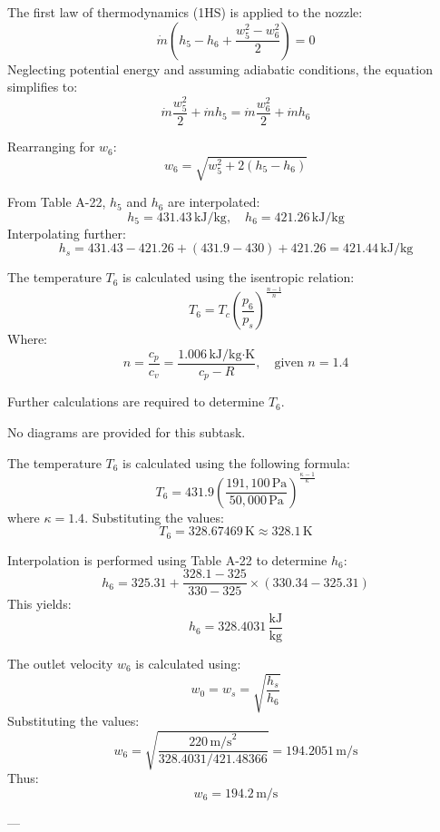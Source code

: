 The first law of thermodynamics (1HS) is applied to the nozzle:  
\[
\dot{m} \left( h_5 - h_6 + \frac{w_5^2 - w_6^2}{2} \right) = 0
\]  
Neglecting potential energy and assuming adiabatic conditions, the equation simplifies to:  
\[
\dot{m} \frac{w_5^2}{2} + \dot{m} h_5 = \dot{m} \frac{w_6^2}{2} + \dot{m} h_6
\]  

Rearranging for \( w_6 \):  
\[
w_6 = \sqrt{w_5^2 + 2(h_5 - h_6)}
\]  

From Table A-22, \( h_5 \) and \( h_6 \) are interpolated:  
\[
h_5 = 431.43 \, \text{kJ/kg}, \quad h_6 = 421.26 \, \text{kJ/kg}
\]  
Interpolating further:  
\[
h_s = 431.43 - 421.26 + (431.9 - 430) + 421.26 = 421.44 \, \text{kJ/kg}
\]  

The temperature \( T_6 \) is calculated using the isentropic relation:  
\[
T_6 = T_c \left( \frac{p_6}{p_s} \right)^{\frac{n-1}{n}}
\]  
Where:  
\[
n = \frac{c_p}{c_v} = \frac{1.006 \, \text{kJ/kg·K}}{c_p - R}, \quad \text{given } n = 1.4
\]  

Further calculations are required to determine \( T_6 \).  

No diagrams are provided for this subtask.

The temperature \( T_6 \) is calculated using the following formula:  
\[
T_6 = 431.9 \left( \frac{191,100 \, \text{Pa}}{50,000 \, \text{Pa}} \right)^{\frac{\kappa - 1}{\kappa}}
\]  
where \( \kappa = 1.4 \). Substituting the values:  
\[
T_6 = 328.67469 \, \text{K} \approx 328.1 \, \text{K}
\]  

Interpolation is performed using Table A-22 to determine \( h_6 \):  
\[
h_6 = 325.31 + \frac{328.1 - 325}{330 - 325} \times (330.34 - 325.31)
\]  
This yields:  
\[
h_6 = 328.4031 \, \frac{\text{kJ}}{\text{kg}}
\]  

The outlet velocity \( w_6 \) is calculated using:  
\[
w_0 = w_s = \sqrt{\frac{h_s}{h_6}}
\]  
Substituting the values:  
\[
w_6 = \sqrt{\frac{220 \, \text{m/s}^2}{328.4031 / 421.48366}} = 194.2051 \, \text{m/s}
\]  
Thus:  
\[
w_6 = 194.2 \, \text{m/s}
\]  

---